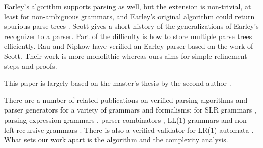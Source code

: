 \documentclass[runningheads]{llncs}
\begin{document}
Earley's algorithm supports parsing as well, but the extension is non-trivial,
at least for non-ambiguous grammars, and Earley's original algorithm could return spurious
parse trees \cite{Tomita}.
Scott \cite[Section 1]{Scott-ENTCS08} gives a short history of the generalizations
of Earley's recognizer to a parser. Part of the difficulty is how to store multiple
parse trees efficiently.
Rau and Nipkow \cite{RauN24} have verified an Earley parser based on the work of Scott.
Their work is more monolithic whereas ours aims for simple refinement steps and proofs.

This paper is largely based on the master's thesis by the second author \cite{Haberl}.

There are a number of related publications on verified parsing algorithms and parser generators
for a variety of grammars and formalisms:
for SLR grammars \cite{BarthwalN09},
parsing expression grammars \cite{KoprowskiB-LMiCS11,BlaudeauS-CPP20},
parser combinators \cite{Ridge-CPP11},
LL(1) grammars \cite{LasserCFR-ITP19} and
non-left-recursive grammars \cite{LasserCFR-PLDI21}.
There is also a verified validator for LR(1) automata \cite{JourdanPL-ESOP12}.
What sets our work apart is the algorithm and the complexity analysis.




%


\end{document}
